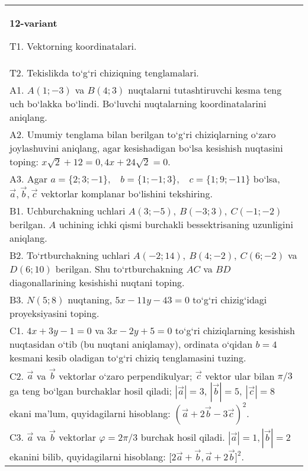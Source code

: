 \documentclass{article}
\begin{document}
\begin{tabular}{m{17cm}}
\textbf{12-variant}

T1. 
Vektorning koordinatalari.
 \\
T2. 
Tekislikda to‘g‘ri chiziqning tenglamalari.
 \\
A1. 
$A (1;-3) $ va $B (4;3) $ nuqtalarni tutashtiruvchi
kesma teng uch bo‘lakka bo‘lindi. Bo‘luvchi nuqtalarning koordinatalarini
aniqlang.
 \\
A2. 
Umumiy tenglama bilan berilgan to‘g‘ri chiziqlarning
o‘zaro joylashuvini aniqlang, agar kesishadigan bo‘lsa kesishish nuqtasini
toping: $x\sqrt{2}+12=0, 4x+24\sqrt{2}=0$.
 \\
A3. 
Agar \(a = \{ 2;3; - 1\}, \ \ \ \ b = \{ 1; - 1;3\}, \ \ \ \ c = \{ 1;9; - 11\}\) bo‘lsa, $\overrightarrow{a}, \overrightarrow{b}, \overrightarrow{c}$ vektorlar komplanar bo‘lishini tekshiring.
 \\
B1. 
Uchburchakning uchlari
\(A (3;-5),\ B (-3;3),\ C (-1;-2) \) berilgan. $A$ uchining ichki qismi
burchakli bessektrisaning uzunligini aniqlang.
 \\
B2. 
To‘rtburchakning uchlari
\(A (-2;14),\ B (4;-2),\ C (6;-2) \) va \(D (6;10) \) berilgan. Shu
to‘rtburchakning $AC$ va $BD$ diagonallarining kesishishi
nuqtani toping.
 \\
B3. 
\(N (5;8) \) nuqtaning, \(5x-11y-43=0\) to‘g‘ri chizig‘idagi
proyeksiyasini toping.
 \\
C1. 
\(4x+3y-1=0\) va \(3x-2y+5=0\)
to‘g‘ri chiziqlarning kesishish nuqtasidan o‘tib (bu nuqtani aniqlamay), ordinata
o‘qidan \(b=4\) kesmani kesib oladigan to‘g‘ri chiziq tenglamasini tuzing.
 \\
C2. 
$\vec{a}$ va $\vec{b}$ vektorlar o‘zaro perpendikulyar; $\vec{c}$ vektor ular bilan $\pi/3$ ga teng bo‘lgan burchaklar hosil qiladi; $|\vec{a}| = 3$, $|\vec{b}| = 5,\ |\vec{c}| = 8$ ekani ma’lum, quyidagilarni hisoblang:
$ (\vec{a} + 2\vec{b} - 3\vec{c}) ^{2}$.
 \\
C3. 
$\vec{a}$ va $\vec{b}$ vektorlar $\varphi = 2\pi/3$ burchak hosil qiladi. $|\vec{a}| = 1,|\vec{b}| = 2$ ekanini bilib, quyidagilarni hisoblang:
$\lbrack 2\overrightarrow{a} + \overrightarrow{b},\overrightarrow{a} + 2\overrightarrow{b}\rbrack^{2}$.
 \\

\end{tabular}
\vspace{1cm}
\end{document}
